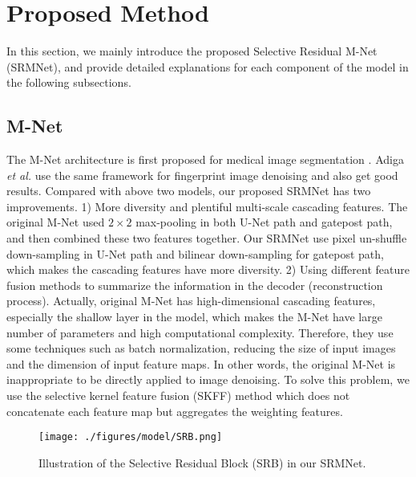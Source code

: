 \documentclass{article}
\begin{document}
\section{Proposed Method}
In this section, we mainly introduce the proposed Selective Residual M-Net (SRMNet), and provide detailed explanations for each component of the model in the following subsections.

\subsection{M-Net}
The M-Net architecture is first proposed for medical image segmentation \cite{mehta2017m}. Adiga \textit{et al.} \cite{adiga2019fpd} use the same framework for fingerprint image denoising and also get good results. Compared with above two models, our proposed SRMNet has two improvements. 1) More diversity and plentiful multi-scale cascading features. The original M-Net used $2 \times 2$ max-pooling in both U-Net path and gatepost path, and then combined these two features together. Our SRMNet use pixel un-shuffle down-sampling in U-Net path and bilinear down-sampling for gatepost path, which makes the cascading features have more diversity. 2) Using different feature fusion methods to summarize the information in the decoder (reconstruction process). Actually, original M-Net has high-dimensional cascading features, especially the shallow layer in the model, which makes the M-Net have large number of parameters and high computational complexity. Therefore, they use some techniques such as batch normalization, reducing the size of input images and the dimension of input feature maps. In other words, the original M-Net is inappropriate to be directly applied to image denoising. To solve this problem, we use the selective kernel feature fusion (SKFF) method \cite{20} which does not concatenate each feature map but aggregates the weighting features.



\begin{figure*}[htbp] 
	\centering
	\texttt{[image: ./figures/model/SRB.png]}
  \caption{Illustration of the Selective Residual Block (SRB) in our SRMNet.}
  \label{SRB}
\end{figure*}
\end{document}
